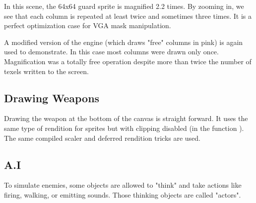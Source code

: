 \par
\begin{figure}[H]
 \centering
\end{figure}
In this scene, the 64x64 guard sprite is magnified 2.2 times. By zooming in, we see that each column is repeated at least twice and sometimes three times. It is a perfect optimization case for VGA mask manipulation.\\
\par
A modified version of the engine (which draws "free" columns in pink) is again used to demonstrate.  In this case most columns were drawn only once. Magnification was a totally free operation despite more than twice the number of texels written to the screen.\\

\par
\begin{figure}[H]
 \centering
\end{figure}
\begin{figure}[H]
 \centering
\end{figure}






\subsection{Drawing Weapons}
Drawing the weapon at the bottom of the canvas is straight forward. It uses the same type of rendition for sprites but with clipping disabled (in the function ). The same compiled scaler and deferred rendition tricks are used.














\subsection{A.I}
To simulate enemies, some objects are allowed to "think" and take actions like firing, walking, or emitting sounds. Those thinking objects are called "actors".\\
\par






